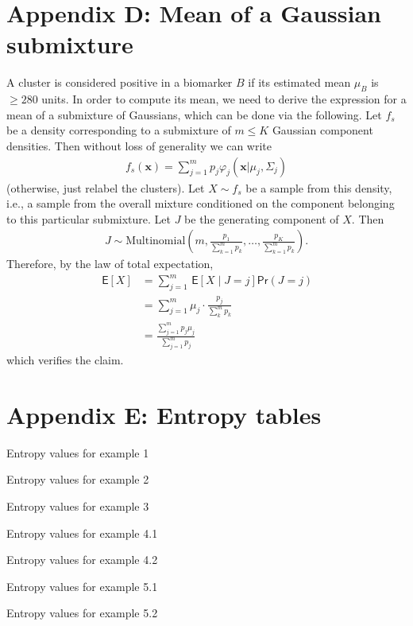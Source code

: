 \documentclass{uwstat572}
\newcommand*\ba{\[ \begin{aligned}}
\newcommand*\ea{\end{aligned} \]}
\newcommand*\E[1]{\;\mathsf{E}\left[#1\right]}
\newcommand*\bx{\mathbf{x}}
\renewcommand\;{\,}
\renewcommand\phi{\varphi}
\renewcommand\Pr[1]{ \mathsf{Pr}\left(#1\right) }
\begin{document}
\section*{Appendix D: Mean of a Gaussian submixture}
A cluster is considered positive in a biomarker $B$ if its estimated mean $\mu_B$ is $\ge 280$ units.
In order to compute its mean, we need to derive the expression for a mean of a submixture of Gaussians, which can be done via the following.
Let $f_s$ be a density corresponding to a submixture of $m \le K$ Gaussian component densities.
Then without loss of generality we can write
\ba
f_s(\bx) = \sum_{j=1}^m p_j \phi_j(\bx | \mu_j, \Sigma_j)
\ea
(otherwise, just relabel the clusters).
Let $X \sim f_s$ be a sample from this density, i.e., a sample from the overall mixture conditioned on the component belonging to this particular submixture.
Let $J$ be the generating component of $X$.
Then
\ba
J \sim \text{Multinomial}\left(m, \frac{p_1}{\sum_{k=1}^m p_k}, \dotsc,
\frac{p_K}{\sum_{k=1}^m p_k}\right).
\ea
Therefore, by the law of total expectation,
\begin{align}\label{mixturemean}
\E{X}
	& = \sum_{j=1}^m \E{X \mid J = j }
			\Pr{ J = j } \nonumber \\
	& = \sum_{j=1}^m \mu_j \cdot \frac{p_j}{ \sum_k^m p_k } \nonumber \\
	& = \frac{ \sum_{j=1}^m p_j \mu_j }{ \sum_{j=1}^m p_j }
\end{align}
which verifies the claim.

\section*{Appendix E: Entropy tables}
\newpage
\begin{table}
 
\caption{Entropy values for example 1}
\label{Table1}
\end{table}

\begin{table}

\caption{Entropy values for example 2}
\label{Table2}
\end{table}

\begin{table}

\caption{Entropy values for example 3}
\label{Table3}
\end{table}

\begin{table}

\caption{Entropy values for example 4.1}
\label{Table41}
\end{table}

\begin{table}

\caption{Entropy values for example 4.2}
\label{Table42}
\end{table}

\begin{table}

\caption{Entropy values for example 5.1}
\label{Table51}
\end{table}

\begin{table}

\caption{Entropy values for example 5.2}
\label{Table52}
\end{table}
\end{document}
